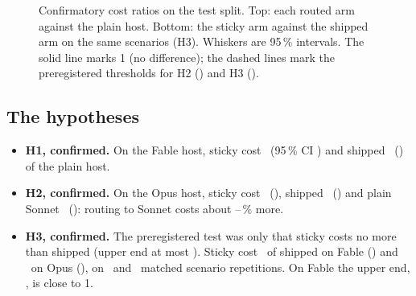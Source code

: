 \begin{figure}[htbp]
\centering
{}\par\smallskip

\caption{Confirmatory cost ratios on the test split. Top: each routed arm against the plain host. Bottom: the
sticky arm against the shipped arm on the same scenarios (H3). Whiskers are 95\,\% intervals. The solid line
marks 1 (no difference); the dashed lines mark the preregistered thresholds for H2 (\HTwoLower) and H3
(\HThreeUpper).}
\label{fig:forest}
\end{figure}

\subsection{The hypotheses}

\begin{table}[htbp]
\centering\small
\caption{The preregistered hypotheses, test split, pair reading. The arm reading gives the same verdicts.}
\label{tab:hyp}

\end{table}

\begin{itemize}
  \item \textbf{H1, confirmed.} On the Fable host, sticky cost \CfFableStickyPair\X\ (95\,\% CI
    \CfFableStickyPairCI) and shipped \CfFableShippedPair\X\ (\CfFableShippedPairCI) of the plain host.
  \item \textbf{H2, confirmed.} On the Opus host, sticky cost \CfOpusStickyPair\X\ (\CfOpusStickyPairCI),
    shipped \CfOpusShippedPair\X\ (\CfOpusShippedPairCI) and plain Sonnet \CfOpusSonnetPair\X\
    (\CfOpusSonnetPairCI): routing to Sonnet costs about \CfOpusStickyExtra--\CfOpusSonnetExtra\,\% more.
  \item \textbf{H3, confirmed.} The preregistered test was only that sticky costs no more than shipped
    (upper end at most \HThreeUpper). Sticky cost \HThreeFable\X\ of shipped on Fable (\HThreeFableCI) and
    \HThreeOpus\X\ on Opus (\HThreeOpusCI), on \HThreeFableN\ and \HThreeOpusN\ matched scenario
    repetitions. On Fable the upper end, \HThreeFableUpper, is close to 1.
\end{itemize}

